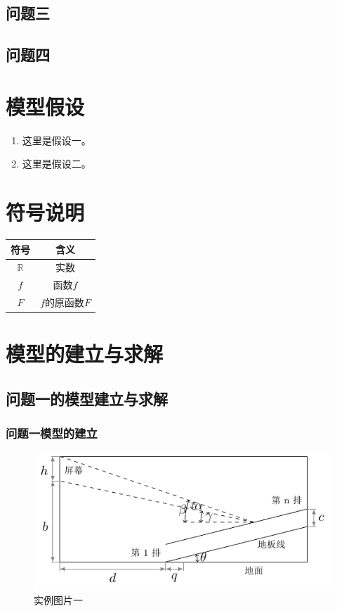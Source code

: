\documentclass[nogbt]{my_cumcmthesis}
\begin{document}
\subsection{问题三}
    \zhlipsum[3-4] %
\subsection{问题四}
    \zhlipsum[5] %

\section{模型假设}
\begin{enumerate}
    \item 这里是假设一。
    \item 这里是假设二。
\end{enumerate}

\section{符号说明}
\begin{center}\begin{tabular}{cc}
    \toprule
    符号 & 含义 \\
    \midrule
    $\mathbb{R}$ & 实数 \\
    $f$ & 函数$f$ \\
    $F$ & $f$的原函数$F$ \\
    \bottomrule
\end{tabular}\end{center}

\section{模型的建立与求解}
\subsection{问题一的模型建立与求解}
\subsubsection{问题一模型的建立}
    \zhlipsum[6-7] %
    \begin{figure}[hbp]
        \centering
        \includegraphics{source/影院纵向剖面示意图.pdf}
        \caption{实例图片一}
        \label{fig:eg1}
    \end{figure}
    \zhlipsum[8] %
\end{document}
